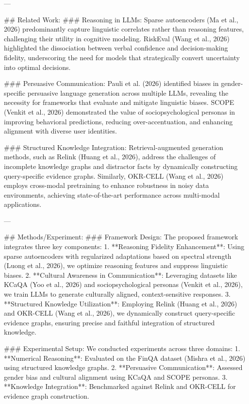 ---

## Related Work:
### Reasoning in LLMs:
Sparse autoencoders (Ma et al., 2026) predominantly capture linguistic correlates rather than reasoning features, challenging their utility in cognitive modeling. RiskEval (Wang et al., 2026) highlighted the dissociation between verbal confidence and decision-making fidelity, underscoring the need for models that strategically convert uncertainty into optimal decisions.

### Persuasive Communication:
Pauli et al. (2026) identified biases in gender-specific persuasive language generation across multiple LLMs, revealing the necessity for frameworks that evaluate and mitigate linguistic biases. SCOPE (Venkit et al., 2026) demonstrated the value of sociopsychological personas in improving behavioral predictions, reducing over-accentuation, and enhancing alignment with diverse user identities.

### Structured Knowledge Integration:
Retrieval-augmented generation methods, such as Relink (Huang et al., 2026), address the challenges of incomplete knowledge graphs and distractor facts by dynamically constructing query-specific evidence graphs. Similarly, OKR-CELL (Wang et al., 2026) employs cross-modal pretraining to enhance robustness in noisy data environments, achieving state-of-the-art performance across multi-modal applications.

---

## Methods/Experiment:
### Framework Design:
The proposed framework integrates three key components:
1. **Reasoning Fidelity Enhancement**: Using sparse autoencoders with regularized adaptations based on spectral strength (Luong et al., 2026), we optimize reasoning features and suppress linguistic biases.
2. **Cultural Awareness in Communication**: Leveraging datasets like KCaQA (Yoo et al., 2026) and sociopsychological personas (Venkit et al., 2026), we train LLMs to generate culturally aligned, context-sensitive responses.
3. **Structured Knowledge Utilization**: Employing Relink (Huang et al., 2026) and OKR-CELL (Wang et al., 2026), we dynamically construct query-specific evidence graphs, ensuring precise and faithful integration of structured knowledge.

### Experimental Setup:
We conducted experiments across three domains:
1. **Numerical Reasoning**: Evaluated on the FinQA dataset (Mishra et al., 2026) using structured knowledge graphs.
2. **Persuasive Communication**: Assessed gender bias and cultural alignment using KCaQA and SCOPE personas.
3. **Knowledge Integration**: Benchmarked against Relink and OKR-CELL for evidence graph construction.

